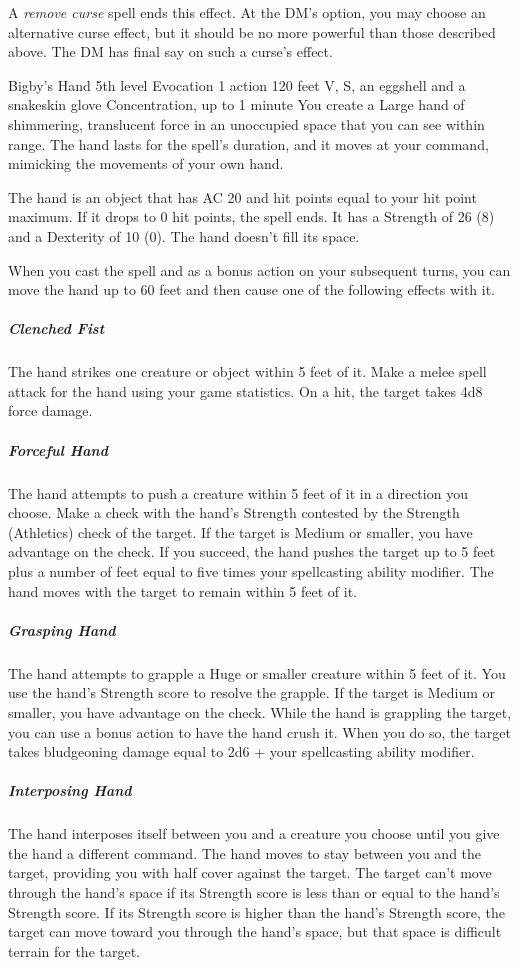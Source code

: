 \documentclass[10pt,a4paper,twoside,bg=print,twocolumn,openany,nodeprecatedcode]{dndbook}
\begin{document}
A \textit{remove curse} spell ends this effect. At the DM's option, you may choose an alternative curse effect, but it should be no more powerful than those described above. The DM has final say on such a curse's effect.



\DndSpellHeader%
{Bigby's Hand}
{5th level Evocation}
{1 action}
{120 feet}
{V, S, an eggshell and a snakeskin glove}
{Concentration, up to 1 minute}
You create a Large hand of shimmering, translucent force in an unoccupied space that you can see within range. The hand lasts for the spell's duration, and it moves at your command, mimicking the movements of your own hand.

The hand is an object that has AC 20 and hit points equal to your hit point maximum. If it drops to 0 hit points, the spell ends. It has a Strength of 26 (8) and a Dexterity of 10 (0). The hand doesn't fill its space.

When you cast the spell and as a bonus action on your subsequent turns, you can move the hand up to 60 feet and then cause one of the following effects with it.

\subparagraph{Clenched Fist}
The hand strikes one creature or object within 5 feet of it. Make a melee spell attack for the hand using your game statistics. On a hit, the target takes 4d8 force damage.

\subparagraph{Forceful Hand}
The hand attempts to push a creature within 5 feet of it in a direction you choose. Make a check with the hand's Strength contested by the Strength (Athletics) check of the target. If the target is Medium or smaller, you have advantage on the check. If you succeed, the hand pushes the target up to 5 feet plus a number of feet equal to five times your spellcasting ability modifier. The hand moves with the target to remain within 5 feet of it.

\subparagraph{Grasping Hand}
The hand attempts to grapple a Huge or smaller creature within 5 feet of it. You use the hand's Strength score to resolve the grapple. If the target is Medium or smaller, you have advantage on the check. While the hand is grappling the target, you can use a bonus action to have the hand crush it. When you do so, the target takes bludgeoning damage equal to 2d6 + your spellcasting ability modifier.

\subparagraph{Interposing Hand}
The hand interposes itself between you and a creature you choose until you give the hand a different command. The hand moves to stay between you and the target, providing you with half cover against the target. The target can't move through the hand's space if its Strength score is less than or equal to the hand's Strength score. If its Strength score is higher than the hand's Strength score, the target can move toward you through the hand's space, but that space is difficult terrain for the target.
\end{document}
